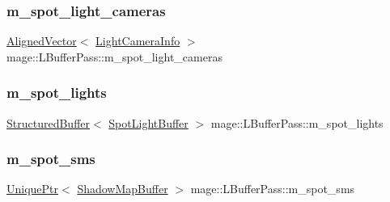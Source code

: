 \hypertarget{classmage_1_1_l_buffer_pass_ae09a921906a3b53074b9d08c1594928f}{}\label{classmage_1_1_l_buffer_pass_ae09a921906a3b53074b9d08c1594928f} 
\subsubsection{\texorpdfstring{m\+\_\+spot\+\_\+light\+\_\+cameras}{m\_spot\_light\_cameras}}
{\footnotesize\ttfamily \hyperlink{namespacemage_a8664bfb5ce2179fc64eae9f82c8a5ba8}{Aligned\+Vector}$<$ \hyperlink{structmage_1_1_l_buffer_pass_1_1_light_camera_info}{Light\+Camera\+Info} $>$ mage\+::\+L\+Buffer\+Pass\+::m\+\_\+spot\+\_\+light\+\_\+cameras\hspace{0.3cm}{\ttfamily [private]}}

\hypertarget{classmage_1_1_l_buffer_pass_af1612aa2a8d24303ebcf9e72125698f3}{}\label{classmage_1_1_l_buffer_pass_af1612aa2a8d24303ebcf9e72125698f3} 
\subsubsection{\texorpdfstring{m\+\_\+spot\+\_\+lights}{m\_spot\_lights}}
{\footnotesize\ttfamily \hyperlink{classmage_1_1_structured_buffer}{Structured\+Buffer}$<$ \hyperlink{structmage_1_1_spot_light_buffer}{Spot\+Light\+Buffer} $>$ mage\+::\+L\+Buffer\+Pass\+::m\+\_\+spot\+\_\+lights\hspace{0.3cm}{\ttfamily [private]}}

\hypertarget{classmage_1_1_l_buffer_pass_a348d64fd92b6198663494d521edcdf6b}{}\label{classmage_1_1_l_buffer_pass_a348d64fd92b6198663494d521edcdf6b} 
\subsubsection{\texorpdfstring{m\+\_\+spot\+\_\+sms}{m\_spot\_sms}}
{\footnotesize\ttfamily \hyperlink{namespacemage_a3316d7143a973e37adf1110f2e80ca31}{Unique\+Ptr}$<$ \hyperlink{structmage_1_1_shadow_map_buffer}{Shadow\+Map\+Buffer} $>$ mage\+::\+L\+Buffer\+Pass\+::m\+\_\+spot\+\_\+sms\hspace{0.3cm}{\ttfamily [private]}}

